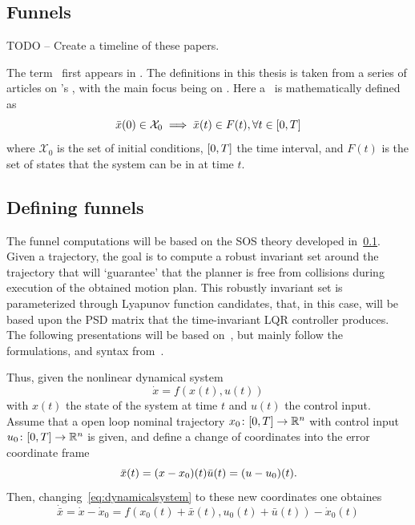 \subsection{Funnels}
\label{sec:Funnels}

TODO -- Create a timeline of these papers.

The term \funnel\ first appears in \cite{masonMechanicsManipulation1985}. The
\funnel{} definitions in this thesis is taken from a series of articles on
\funnel{}'s \cite{tobenkinInvariantFunnelsTrajectories2010}
\cite{tedrakeLQRtreesFeedbackMotion2009} \cite{majumdarRobustOnlineMotion2013}
\cite{majumdarFunnelLibrariesRealtime2017}
\cite{ahmadiDSOSSDSOSOptimization2017}, with the main focus being on
\cite{majumdarFunnelLibrariesRealtime2017}. Here a \funnel\ is mathematically
defined as
\[
  \bar{x}(0) \in \mathcal{X}_0 \implies \bar{x}(t) \in F(t), \forall t \in
  \lbrack0,T\rbrack
\]
where \(\mathcal{X}_0\) is the set of initial conditions, \(\lbrack0,T\rbrack\) the time
interval, and \(F(t)\) is the set of states that the system can be in at time
\(t\).

\subsection{Defining funnels}

The funnel computations will be based on the \ac{SOS} theory developed
in~\ref{sec:Funnels}. Given a trajectory, the goal is to compute a robust
invariant set around the trajectory that will `guarantee' that the planner is
free from collisions during execution of the obtained motion plan. This robustly
invariant set is parameterized through Lyapunov function candidates, that, in
this case, will be based upon the \ac{PSD} matrix that the time-invariant
\ac{LQR} controller produces. The following presentations will be based
on~\cite{tobenkinInvariantFunnelsTrajectories2010,
  tedrakeLQRtreesFeedbackMotion2009, majumdarRobustOnlineMotion2013}, but mainly
follow the formulations, and syntax
from~\cite{majumdarFunnelLibrariesRealtime2017}.

Thus, given the nonlinear dynamical system
\begin{equation}
  \label{eq:dynamicalsystem}
  \dot{x} = f(x(t), u(t))
\end{equation}
with \(x(t)\) the state of the system at time \(t\) and \(u(t)\) the control
input. Assume that a open loop nominal trajectory \(x_0 \colon [0,T] \rightarrow
\mathbb{R}^n\) with control input \(u_0 \colon [0,T] \rightarrow \mathbb{R}^n\) is given, and
define a change of coordinates into the error coordinate frame
\[
  \bar{x}(t) = (x - x_0)(t) \\
  \bar{u}(t) = (u - u_0)(t).
\]
Then, changing~\ref{eq:dynamicalsystem} to these new coordinates one obtaines
\begin{equation}
  \dot{\bar{x}} = \dot{x} - \dot{x}_0 = f(x_0(t) + \bar{x}(t), u_0(t) + \bar{u}(t)) - \dot{x}_0(t)
\end{equation}

